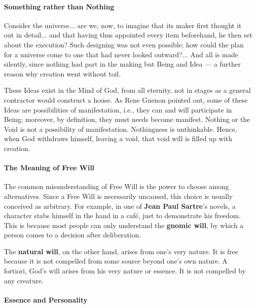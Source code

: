 \paragraph{Something rather than Nothing}


\begin{quotex}
Consider the universe... are we, now, to imagine that its maker first thought it out in detail... and that having thus appointed every item beforehand, he then set about the execution? Such designing was not even possible; how could the plan for a universe come to one that had never looked outward?... And all is made silently, since nothing had part in the making but Being and Idea --- a further reason why creation went without toil.
\end{quotex}


These Ideas exist in the Mind of God, from all eternity, not in stages as a general contractor would construct a house. As Rene Guenon pointed out, some of these Ideas are possibilities of manifestation, i.e., they can and will participate in Being; moreover, by definition, they must needs become manifest. Nothing or the Void is not a possibility of manifestation. Nothingness is unthinkable. Hence, when God withdraws himself, leaving a void, that void will is filled up with creation.

\paragraph{The Meaning of Free Will}


The common misunderstanding of Free Will is the power to choose among alternatives. Since a Free Will is necessarily uncaused, this choice is usually conceived as arbitrary. For example, in one of \textbf{Jean Paul Sartre}'s novels, a character stabs himself in the hand in a café, just to demonstrate his freedom. This is because most people can only understand the \textbf{gnomic will}, by which a person comes to a decision after deliberation.

The \textbf{natural will}, on the other hand, arises from one's very nature. It is free because it is not compelled from some source beyond one's own nature. A fortiori, God's will arises from his very nature or essence. It is not compelled by any creature.

\paragraph{Essence and Personality}


